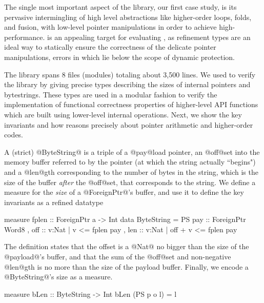 The single most important aspect of the \bytestring 
library, %
our first case study, is its pervasive intermingling of
high level abstractions like higher-order loops,
folds, and fusion, with low-level pointer 
manipulations in order to achieve high-performance. 
%
%
\bytestring is an appealing target for evaluating
\toolname, as refinement types are an ideal way to 
statically ensure the correctness of the delicate 
pointer manipulations, errors in which lie below 
the scope of dynamic protection.

The library spans $8$ files (modules) totaling about 3,500 lines.
We used \toolname to verify the library by giving precise 
types describing the sizes of internal pointers and bytestrings. 
These types are used in a modular fashion to verify the 
implementation of functional correctness properties of 
higher-level API functions which are built using 
lower-level internal operations. 
Next, we show the key invariants and how
\toolname reasons precisely about pointer
arithmetic and higher-order codes.

A (strict) @ByteString@ is a triple of a @pay@load pointer, 
an @off@set into the memory buffer referred to by the pointer 
(at which the string actually ``begins") and a @len@gth 
corresponding to the number of bytes in the string, which is 
the size of the buffer \emph{after} the @off@set, that
corresponds to the string.
%
We define a measure for the \emph{size} of 
a @ForeignPtr@'s buffer, and use it to define 
the key invariants as a refined datatype 
%
\begin{code}
  measure fplen  :: ForeignPtr a -> Int
  data ByteString = PS 
     { pay :: ForeignPtr Word8
     , off :: {v:Nat | v       <= fplen pay }
     , len :: {v:Nat | off + v <= fplen pay } }
\end{code}
%
The definition states that 
the offset is a @Nat@ no bigger than the size of 
the @payload@'s buffer, and that
the sum of the @off@set and non-negative @len@gth
is no more than the size of the payload buffer.
Finally, we encode a @ByteString@'s size as a measure.
%
\begin{code}
  measure bLen   :: ByteString -> Int
  bLen (PS p o l) = l
\end{code}

